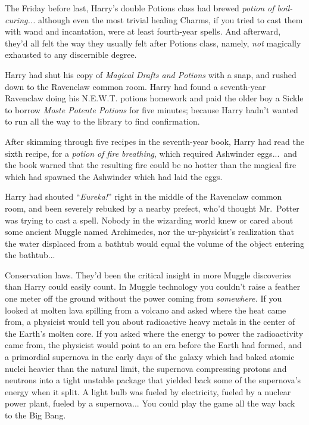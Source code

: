 The Friday before last, Harry’s double Potions class had brewed
\emph{potion of boil-curing...} although even the most trivial
healing Charms, if you tried to cast them with wand and
incantation, were at least fourth-year spells. And afterward,
they’d all felt the way they usually felt after Potions class,
namely, \emph{not} magically exhausted to any discernible
degree.

Harry had shut his copy of \emph{Magical Drafts and Potions}
with a snap, and rushed down to the Ravenclaw common room. Harry
had found a seventh-year Ravenclaw doing his N.E.W.T. potions
homework and paid the older boy a Sickle to borrow \emph{Moste Potente
Potions} for five minutes; because Harry hadn’t wanted to run
all the way to the library to find confirmation.

After skimming through five recipes in the seventh-year book,
Harry had read the sixth recipe, for a \emph{potion of fire
breathing}, which required Ashwinder eggs...\ and the book warned
that the resulting fire could be no hotter than the magical fire
which had spawned the Ashwinder which had laid the eggs.

Harry had shouted “\emph{Eureka!}” right in the middle of the
Ravenclaw common room, and been severely rebuked by a nearby
prefect, who’d thought Mr.~Potter was trying to cast a spell.
Nobody in the wizarding world knew or cared about some ancient
Muggle named Archimedes, nor the ur-physicist’s realization that
the water displaced from a bathtub would equal the volume of the
object entering the bathtub...

Conservation laws. They’d been the critical insight in more
Muggle discoveries than Harry could easily count. In Muggle
technology you couldn’t raise a feather one meter off the ground
without the power coming from \emph{somewhere.} If you looked at
molten lava spilling from a volcano and asked where the heat came
from, a physicist would tell you about radioactive heavy metals in
the center of the Earth’s molten core. If you asked where the
energy to power the radioactivity came from, the physicist would
point to an era before the Earth had formed, and a primordial
supernova in the early days of the galaxy which had baked atomic
nuclei heavier than the natural limit, the supernova compressing
protons and neutrons into a tight unstable package that yielded
back some of the supernova’s energy when it split. A light bulb was
fueled by electricity, fueled by a nuclear power plant, fueled by a
supernova... You could play the game all the way back to the Big
Bang.

